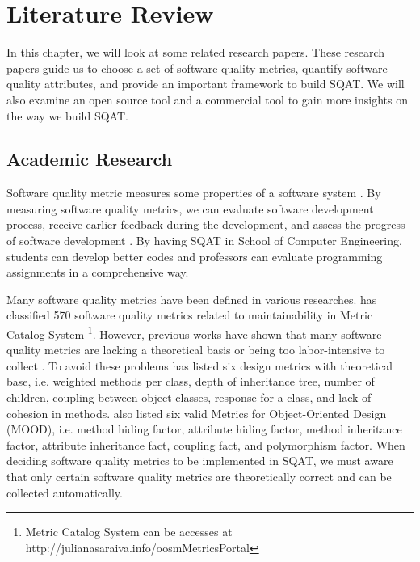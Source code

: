 \chapter{Literature Review}

In this chapter, we will look at some related research papers. These research papers guide us to choose a set of software quality metrics, quantify software quality attributes, and provide an important framework to build SQAT. We will also examine an open source tool and a commercial tool to gain more insights on the way we build SQAT. 

\section{Academic Research}

Software quality metric measures some properties of a software system \cite[]{washizaki2007framework}. By measuring software quality metrics, we can evaluate software development process, receive earlier feedback during the development, and assess the progress of software development \cite[]{yi1994goal}. By having SQAT in School of Computer Engineering, students can develop better codes and professors can evaluate programming assignments in a comprehensive way. 

Many software quality metrics have been defined in various researches. \cite{de2015classifying} has classified 570 software quality metrics related to maintainability in Metric Catalog System \footnote{Metric Catalog System can be accesses at http://julianasaraiva.info/oosmMetricsPortal}. However, previous works have shown that many software quality metrics are lacking a theoretical basis \cite[]{vessey1984research} or being too labor-intensive to collect \cite[]{kemerer1993reliability}. To avoid these problems \cite{chidamber1994metrics} has listed six design metrics with theoretical base, i.e. weighted methods per class, depth of inheritance tree, number of children, coupling between object classes, response for a class, and lack of cohesion in methods. \cite{harrison1998evaluation} also listed six valid Metrics for Object-Oriented Design (MOOD), i.e. method hiding factor, attribute hiding factor, method inheritance factor, attribute inheritance fact, coupling fact, and polymorphism factor. When deciding software quality metrics to be implemented in SQAT, we must aware that only certain software quality metrics are theoretically correct and can be collected automatically. 

